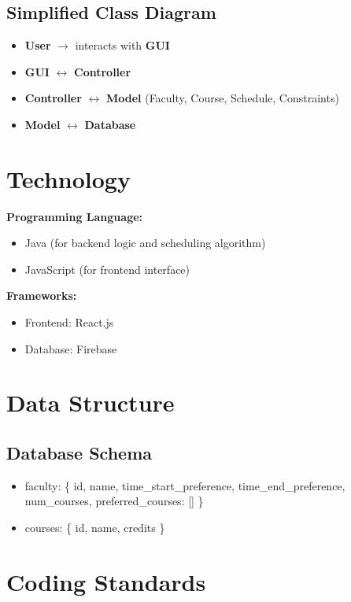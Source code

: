 \documentclass{article}
\begin{document}
\subsection{Simplified Class Diagram}
\begin{itemize}
    \item \textbf{User} $\rightarrow$ interacts with \textbf{GUI}
    \item \textbf{GUI} $\leftrightarrow$ \textbf{Controller}
    \item \textbf{Controller} $\leftrightarrow$ \textbf{Model} (Faculty, Course, Schedule, Constraints)
    \item \textbf{Model} $\leftrightarrow$ \textbf{Database}
\end{itemize}

\section{Technology}

\textbf{Programming Language:}
\begin{itemize}
    \item Java (for backend logic and scheduling algorithm)
    \item JavaScript (for frontend interface)
\end{itemize}

\textbf{Frameworks:}
\begin{itemize}
    \item Frontend: React.js
    \item Database: Firebase
\end{itemize}

\section{Data Structure}

\subsection{Database Schema}
\begin{itemize}
    \item faculty: \{ id, name, time\_start\_preference, time\_end\_preference, num\_courses, preferred\_courses: [] \}
    \item courses: \{ id, name, credits \}
\end{itemize}

\section{Coding Standards}
\end{document}
